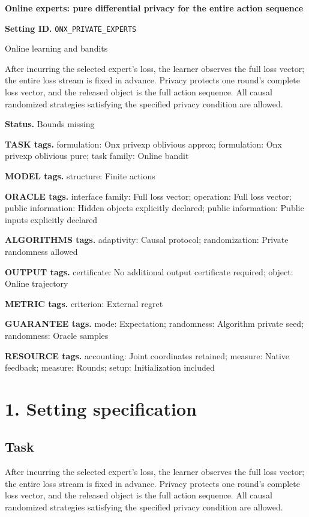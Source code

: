 \documentclass[10pt,a4paper]{article}
\begin{document}
\raggedright

{\LARGE\bfseries\sffamily\color{AtlasNavy} Online experts: pure differential privacy for the entire action sequence\par}\vspace{5pt}
\textbf{Setting ID.} \texttt{ONX\_\allowbreak{}PRIVATE\_\allowbreak{}EXPERTS}

Online learning and bandits

After incurring the selected expert's loss, the learner observes the full loss vector; the entire loss stream is fixed in advance. Privacy protects one round's complete loss vector, and the released object is the full action sequence. All causal randomized strategies satisfying the specified privacy condition are allowed.

\textbf{Status.} Bounds missing

\textbf{TASK tags.} formulation: Onx privexp oblivious approx; formulation: Onx privexp oblivious pure; task family: Online bandit

\textbf{MODEL tags.} structure: Finite actions

\textbf{ORACLE tags.} interface family: Full loss vector; operation: Full loss vector; public information: Hidden objects explicitly declared; public information: Public inputs explicitly declared

\textbf{ALGORITHMS tags.} adaptivity: Causal protocol; randomization: Private randomness allowed

\textbf{OUTPUT tags.} certificate: No additional output certificate required; object: Online trajectory

\textbf{METRIC tags.} criterion: External regret

\textbf{GUARANTEE tags.} mode: Expectation; randomness: Algorithm private seed; randomness: Oracle samples

\textbf{RESOURCE tags.} accounting: Joint coordinates retained; measure: Native feedback; measure: Rounds; setup: Initialization included

\section{1. Setting specification}
\subsection{Task}
After incurring the selected expert's loss, the learner observes the full loss vector; the entire loss stream is fixed in advance. Privacy protects one round's complete loss vector, and the released object is the full action sequence. All causal randomized strategies satisfying the specified privacy condition are allowed.
\end{document}
